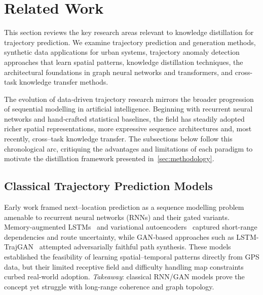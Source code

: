\section{Related Work}
\label{sec:lit-review}

This section reviews the key research areas relevant to knowledge distillation for trajectory prediction. We examine trajectory prediction and generation methods, synthetic data applications for urban systems, trajectory anomaly detection approaches that learn spatial patterns, knowledge distillation techniques, the architectural foundations in graph neural networks and transformers, and cross-task knowledge transfer methods.


The evolution of data‐driven trajectory research mirrors the broader progression of sequential modelling in artificial intelligence.  Beginning with recurrent neural networks and hand‐crafted statistical baselines, the field has steadily adopted richer spatial representations, more expressive sequence architectures and, most recently, cross–task knowledge transfer.  The subsections below follow this chronological arc, critiquing the advantages and limitations of each paradigm to motivate the distillation framework presented in~\autoref{sec:methodology}.

\subsection{Classical Trajectory Prediction Models}
\label{sec:lit-traj-pred}
Early work framed next–location prediction as a sequence modelling problem amenable to recurrent neural networks (RNNs) and their gated variants.  Memory‐augmented LSTMs~\cite{liang2018memory} and variational autoencoders~\cite{liuOnlineAnomalousTrajectory2020} captured short-range dependencies and route uncertainty, while GAN‐based approaches such as LSTM-TrajGAN~\cite{raoLSTMTrajGANDeepLearning2020} attempted adversarially faithful path synthesis.  These models established the feasibility of learning spatial–temporal patterns directly from GPS data, but their limited receptive field and difficulty handling map constraints curbed real-world adoption.  \textit{Takeaway}: classical RNN/GAN models prove the concept yet struggle with long-range coherence and graph topology.

